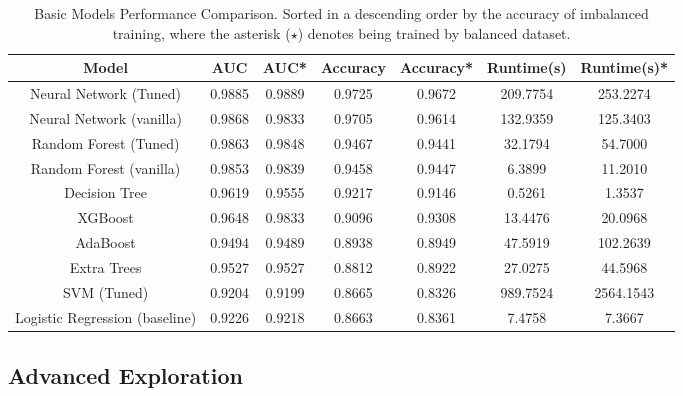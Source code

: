 \documentclass[10pt,twocolumn,letterpaper]{article}
\begin{document}
\begin{table}[h]
\begin{center}
\begin{tabular}{|c|c|c|c|c|c|c|} \hline
Model & AUC &  AUC* & Accuracy & Accuracy* & Runtime(s) & Runtime(s)* \\ \hline
Neural Network (Tuned)         
&  0.9885 &  0.9889 &    0.9725 &      0.9672 &    209.7754 &      253.2274 \\
Neural Network (vanilla)       
&  0.9868 &  0.9833 &    0.9705 &      0.9614 &    132.9359 &      125.3403 \\
Random Forest (Tuned)          
&  0.9863 &  0.9848 &    0.9467 &      0.9441 &     32.1794 &       54.7000 \\
Random Forest (vanilla)       
&  0.9853 &  0.9839 &    0.9458 &      0.9447 &      6.3899 &       11.2010 \\
Decision Tree                
&  0.9619 &  0.9555 &    0.9217 &      0.9146 &      0.5261 &        1.3537 \\
XGBoost                        
&  0.9648 &  0.9833 &    0.9096 &      0.9308 &     13.4476 &       20.0968 \\
AdaBoost                       
&  0.9494 &  0.9489 &    0.8938 &      0.8949 &     47.5919 &      102.2639 \\
Extra Trees                    
&  0.9527 &  0.9527 &    0.8812 &      0.8922 &     27.0275 &       44.5968 \\
SVM (Tuned)                    
&  0.9204 &  0.9199 &    0.8665 &      0.8326 &    989.7524 &     2564.1543 \\
Logistic Regression (baseline) 
&  0.9226 &  0.9218 &    0.8663 &      0.8361 &      7.4758 &        7.3667 \\ \hline
\end{tabular}
\end{center}
\caption{\label{tab:ModelPerformance} Basic Models Performance Comparison. Sorted in a descending order by the accuracy of imbalanced training, where the asterisk ($\star$) denotes being trained by balanced dataset.} 
\end{table}

\subsection{Advanced Exploration}
\end{document}
